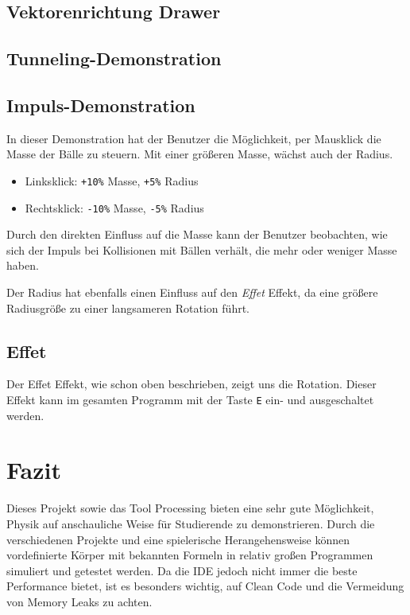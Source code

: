 \documentclass[12pt,a4paper]{article}
\begin{document}
	\subsection{Vektorenrichtung Drawer}
	
	\subsection{Tunneling-Demonstration}
	
	
	\subsection{Impuls-Demonstration}
In dieser Demonstration hat der Benutzer die Möglichkeit, per Mausklick die Masse der Bälle zu steuern.  
Mit einer größeren Masse, wächst auch der Radius. 
\begin{itemize}
	\item Linksklick: \texttt{+10\%} Masse, \texttt{+5\%} Radius  
	\item Rechtsklick: \texttt{-10\%} Masse, \texttt{-5\%} Radius  
\end{itemize}

Durch den direkten Einfluss auf die Masse kann der Benutzer beobachten, wie sich der Impuls bei Kollisionen mit Bällen verhält, die mehr oder weniger Masse haben.  

Der Radius hat ebenfalls einen Einfluss auf den \emph{Effet} Effekt, da eine größere Radiusgröße zu einer langsameren Rotation führt.

	
	
	\subsection{Effet}
	
	Der Effet Effekt, wie schon oben beschrieben, zeigt uns die Rotation. Dieser Effekt kann im gesamten Programm mit der Taste \texttt{E} ein- und ausgeschaltet werden.
	
	\section{Fazit}
	
Dieses Projekt sowie das Tool Processing bieten eine sehr gute Möglichkeit, Physik auf anschauliche Weise für Studierende zu demonstrieren. Durch die verschiedenen Projekte und eine spielerische Herangehensweise können vordefinierte Körper mit bekannten Formeln in relativ großen Programmen simuliert und getestet werden. Da die IDE jedoch nicht immer die beste Performance bietet, ist es besonders wichtig, auf Clean Code und die Vermeidung von Memory Leaks zu achten.
	
\end{document}
